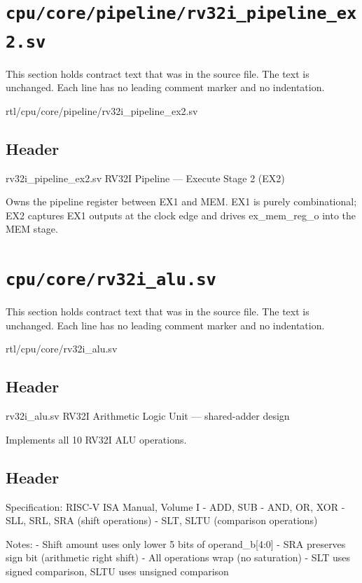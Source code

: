 \section{\texttt{cpu/core/pipeline/rv32i\_pipeline\_ex2.sv}}\label{ds:mod:rv32i-pipeline-ex2}

This section holds contract text that was in the source file. The text is unchanged. Each line has no leading comment marker and no indentation.

\begin{relocated}{rtl/cpu/core/pipeline/rv32i_pipeline_ex2.sv}

\subsection*{Header}

\begin{textblock}
rv32i_pipeline_ex2.sv
RV32I Pipeline — Execute Stage 2 (EX2)

Owns the pipeline register between EX1 and MEM.
EX1 is purely combinational; EX2 captures EX1 outputs at the clock edge
and drives ex_mem_reg_o into the MEM stage.
\end{textblock}

\end{relocated}

\section{\texttt{cpu/core/rv32i\_alu.sv}}\label{ds:mod:rv32i-alu}

This section holds contract text that was in the source file. The text is unchanged. Each line has no leading comment marker and no indentation.

\begin{relocated}{rtl/cpu/core/rv32i_alu.sv}

\subsection*{Header}

\begin{textblock}
rv32i_alu.sv
RV32I Arithmetic Logic Unit — shared-adder design

Implements all 10 RV32I ALU operations.
\end{textblock}

\subsection*{Header}

\begin{textblock}
Specification: RISC-V ISA Manual, Volume I
- ADD, SUB
- AND, OR, XOR
- SLL, SRL, SRA (shift operations)
- SLT, SLTU (comparison operations)

Notes:
- Shift amount uses only lower 5 bits of operand_b[4:0]
- SRA preserves sign bit (arithmetic right shift)
- All operations wrap (no saturation)
- SLT uses signed comparison, SLTU uses unsigned comparison
\end{textblock}

\end{relocated}

